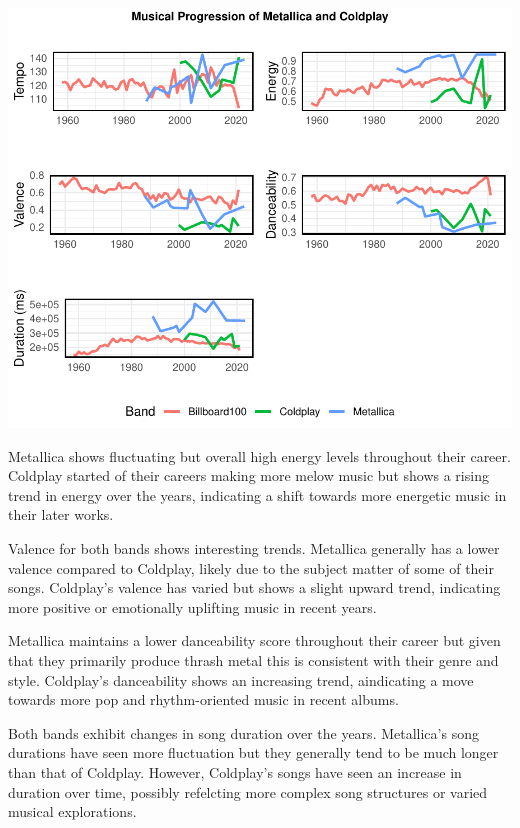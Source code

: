 \documentclass[11pt,preprint, authoryear]{elsarticle}
\let\origfigure\figure
\let\endorigfigure\endfigure
\renewenvironment{figure}[1][2] {
    \expandafter\origfigure\expandafter[H]
} {
    \endorigfigure
}
\numberwithin{equation}{section}
\numberwithin{figure}{section}
\numberwithin{table}{section}
\begin{document}
\begin{figure}[H]

{\centering \includegraphics{Question2_files/figure-latex/Figure3-1} 

}

\caption{Evolution of Music over time \label{Figure3}}\label{fig:Figure3}
\end{figure}

Metallica shows fluctuating but overall high energy levels throughout
their career. Coldplay started of their careers making more melow music
but shows a rising trend in energy over the years, indicating a shift
towards more energetic music in their later works.

Valence for both bands shows interesting trends. Metallica generally has
a lower valence compared to Coldplay, likely due to the subject matter
of some of their songs. Coldplay's valence has varied but shows a slight
upward trend, indicating more positive or emotionally uplifting music in
recent years.

Metallica maintains a lower danceability score throughout their career
but given that they primarily produce thrash metal this is consistent
with their genre and style. Coldplay's danceability shows an increasing
trend, aindicating a move towards more pop and rhythm-oriented music in
recent albums.

Both bands exhibit changes in song duration over the years. Metallica's
song durations have seen more fluctuation but they generally tend to be
much longer than that of Coldplay. However, Coldplay's songs have seen
an increase in duration over time, possibly refelcting more complex song
structures or varied musical explorations.
\end{document}
